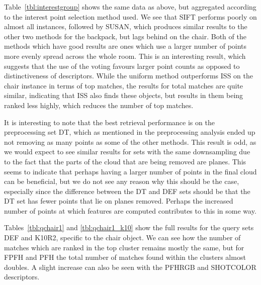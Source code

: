 \documentclass[11pt,a4paper]{kth-mag}
\begin{document}
Table~\ref{tbl:interestgroup} shows the same data as above, but aggregated
according to the interest point selection method used. We see that SIFT performs
poorly on almost all instances, followed by SUSAN, which produces similar
results to the other two methods for the backpack, but lags behind on the chair.
Both of the methods which have good results are ones which use a larger number
of points more evenly spread across the whole room. This is an interesting
result, which suggests that the use of the voting favours larger point counts as
opposed to distinctiveness of descriptors. While the uniform method outperforms
ISS on the chair instance in terms of top matches, the results for total matches
are quite similar, indicating that ISS also finds these objects, but results in
them being ranked less highly, which reduces the number of top matches.

It is interesting to note that the best retrieval performance is on the
preprocessing set DT, which as mentioned in the preprocessing analysis ended up
not removing as many points as some of the other methods. This result is odd, as
we would expect to see similar results for sets with the same downsampling due
to the fact that the parts of the cloud that are being removed are planes. This
seems to indicate that perhaps having a larger number of points in the final
cloud can be beneficial, but we do not see any reason why this should be the
case, especially since the difference between the DT and DEF sets should be that
the DT set has fewer points that lie on planes removed. Perhaps the increased
number of points at which features are computed contributes to this in some way.

Tables~\ref{tbl:qchair1} and \ref{tbl:qchair1_k10} show the full results for the
query sets DEF and K10R2, specific to the chair object. We can see how the
number of matches which are ranked in the top cluster remains mostly the same,
but for FPFH and PFH the total number of matches found within the clusters
almost doubles. A slight increase can also be seen with the PFHRGB and SHOTCOLOR
descriptors.
\end{document}

